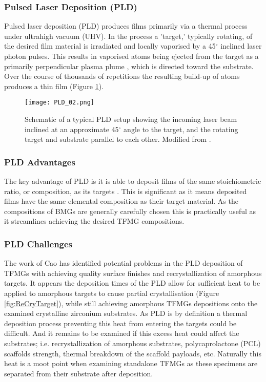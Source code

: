 \documentclass[a4paper,12pt,oneside]{report}%
\begin{document}
\subsubsection{Pulsed Laser Deposition (PLD)}
Pulsed laser deposition (PLD) produces films primarily via a thermal process under ultrahigh vacuum (UHV). In the process a 'target,' typically rotating, of the desired film material is irradiated and locally vaporised by a 45$^{\circ}$ inclined laser photon pulses. This results in vaporised atoms being ejected from the target as a primarily perpendicular plasma plume , which is directed toward the substrate. Over the course of thousands of repetitions the resulting build-up of atoms produces a thin film (Figure \ref{fig:PLD}). 

\begin{figure}[htbp]
	\centering
	\texttt{[image: PLD\_02.png]}
	\caption{Schematic of a typical PLD setup showing the incoming laser beam inclined at an approximate 45$^{\circ}$ angle to the target, and the rotating target and substrate parallel to each other. Modified from \cite{Krebs1993}.}
	\label{fig:PLD}
\end{figure}

\subsubsection{PLD Advantages}
The key advantage of PLD is it is able to deposit films of the same stoichiometric ratio, or composition, as its targets \cite{Dijkkamp1987, Heitz1990}. This is significant as it means deposited films have the same elemental composition as their target material. As the compositions of BMGs are generally carefully chosen this is practically useful as it streamlines achieving the desired TFMG compositions. 

\subsubsection{PLD Challenges}
The work of Cao \cite{Cao2013} has identified potential problems in the PLD deposition of TFMGs with achieving quality surface finishes and recrystallization of amorphous targets. It appears the deposition times of the PLD allow for sufficient heat to be applied to amorphous targets to cause partial crystallisation (Figure \ref{fig:ReCryTarget}), while still achieving amorphous TFMGs depositions onto the examined crystalline zirconium substrates. As PLD is by definition a thermal deposition process preventing this heat from entering the targets could be difficult. And it remains to be examined if this excess heat could affect the substrates; i.e. recrystallization of amorphous substrates, polycaprolactone (PCL) scaffolds strength, thermal breakdown of the scaffold payloads, etc. Naturally this heat is a moot point when examining standalone TFMGs as these specimens are separated from their substrate after deposition. 
\end{document}
